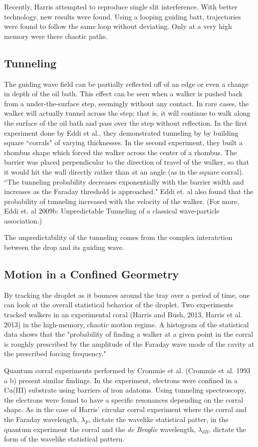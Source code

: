 Recently, Harris attempted to reproduce single slit interference. With better technology, new results were found. Using a looping guiding batt, trajectories were found to follow the same loop without deviating. Only at a very high memory were there chaotic paths.
	       \subsection{Tunneling}
	       The guiding wave field can be partially reflected off of an edge or even a change in depth of the oil bath. This effect can be seen when a walker is pushed back from a under-the-surface step, seemingly without any contact. In rare cases, the walker will actually tunnel across the step; that is, it will continue to walk along the surface of the oil bath and pass over the step without reflection. In the first experiment done by Eddi et al., they demonstrated tunneling by by building square ``corrals" of varying thicknesses. In the second experiment, they built a rhombus shape which forced the walker across the center of a rhombus. The barrier was placed perpendicular to the direction of travel of the walker, so that it would hit the wall directly rather than at an angle (as in the square corral). ``The tunneling probability decreases exponentially with the barrier width and increases as the Faraday threshold is approached." Eddi et. al also found that the probability of tunneling increased with the velocity of the walker. (For more, Eddi et. al 2009b: Unpredictable Tunneling of a classical wave-particle association.)
	       
	       
	        The unpredictability of the tunneling comes from the complex interatction between the drop and its guiding wave. 

\subsection{Motion in a Confined Geormetry}
By tracking the droplet as it bounces around the tray over a period of time, one can look at the overall statistical behavior of the droplet. Two experiments tracked walkers in an experimental coral (Harris and Bush, 2013, Harris et al. 2013) in the high-memory, chaotic motion regime. A histogram of the statistical data shows that the "probability of finding a walker at a given point in the corral is roughly prescribed by the amplitude of the Faraday wave mode of the cavity at the prescribed forcing frequency."

Quantum corral experiments performed by Crommie et al. (Crommie et al. 1993 a b) present similar findings. In the experiment, electrons were confined in a Cu(III) substrate using barriers of iron adatoms. Using tunneling spectroscopy, the electrons were found to have a specific resonances depending on the corral shape. As in the case of Harris' circular corral experiment where the corral and the Faraday wavelength, $\lambda_F$, dictate the wavelike statistical patter, in the quantum experiment the corral and the \textit{de Broglie} wavelength, $\lambda_{dB}$, dictate the form of the wavelike statistical pattern. 

